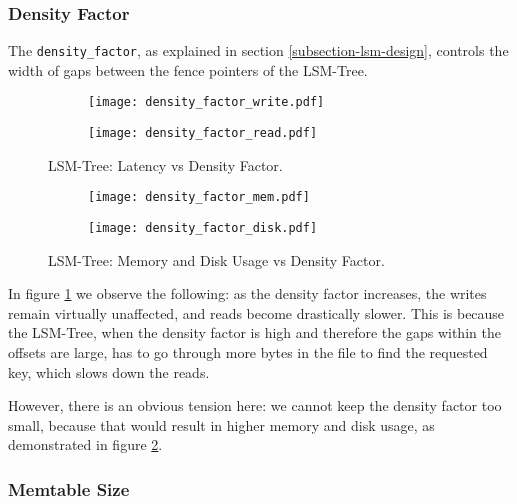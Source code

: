 \subsubsection{Density Factor}
The \verb"density_factor", as explained in section \ref{subsection-lsm-design}, controls the width of gaps between the fence pointers of the LSM-Tree.

\begin{figure}[h]
    \begin{subfigure}{.5\textwidth}
        \centering
        \texttt{[image: density\_factor\_write.pdf]}
    \end{subfigure}
    \begin{subfigure}{.5\textwidth}
        \centering
        \texttt{[image: density\_factor\_read.pdf]}
    \end{subfigure}
    \caption{LSM-Tree: Latency vs Density Factor.}
    \label{fig:density_factor_write_read}
\end{figure}

\begin{figure}[h]
    \begin{subfigure}{.5\textwidth}
        \centering
        \texttt{[image: density\_factor\_mem.pdf]}
    \end{subfigure}
    \begin{subfigure}{.5\textwidth}
        \centering
        \texttt{[image: density\_factor\_disk.pdf]}
    \end{subfigure}
    \caption{LSM-Tree: Memory and Disk Usage vs Density Factor.}
    \label{fig:density_factor_mem_disk}
\end{figure}

In figure \ref{fig:density_factor_write_read} we observe the following: as the density factor increases, the writes remain virtually unaffected, and reads become drastically slower. This is because the LSM-Tree, when the density factor is high and therefore the gaps within the offsets are large, has to go through more bytes in the file to find the requested key, which slows down the reads.

However, there is an obvious tension here: we cannot keep the density factor too small, because that would result in higher memory and disk usage, as demonstrated in figure \ref{fig:density_factor_mem_disk}.

\subsubsection{Memtable Size}

